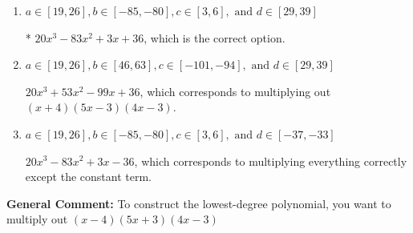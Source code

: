\documentclass{extbook}[14pt]
\begin{document}
\begin{enumerate}
{\begin{enumerate}[label=\Alph*.]
$20x^{3} +77 x^{2} -21 x -36$, which corresponds to multiplying out $(x + 4)(5x + 3)(4x -3)$.
\item \( a \in [19, 26], b \in [-85, -80], c \in [3, 6], \text{ and } d \in [29, 39] \)

* $20x^{3} -83 x^{2} +3 x + 36$, which is the correct option.
\item \( a \in [19, 26], b \in [46, 63], c \in [-101, -94], \text{ and } d \in [29, 39] \)

$20x^{3} +53 x^{2} -99 x + 36$, which corresponds to multiplying out $(x + 4)(5x -3)(4x -3)$.
\item \( a \in [19, 26], b \in [-85, -80], c \in [3, 6], \text{ and } d \in [-37, -33] \)

$20x^{3} -83 x^{2} +3 x -36$, which corresponds to multiplying everything correctly except the constant term.
\end{enumerate}

\textbf{General Comment:} To construct the lowest-degree polynomial, you want to multiply out $(x -4)(5x + 3)(4x -3)$
}
\end{enumerate}
\end{document}

